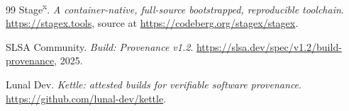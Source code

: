 \documentclass[11pt]{article}
\begin{document}
\begin{thebibliography}{99}
Stage\textsuperscript{x}.
\newblock \emph{A container-native, full-source bootstrapped, reproducible toolchain}.
\newblock \url{https://stagex.tools}, source at \url{https://codeberg.org/stagex/stagex}.

SLSA Community.
\newblock \emph{Build: Provenance v1.2}.
\newblock \url{https://slsa.dev/spec/v1.2/build-provenance}, 2025.

Lunal Dev.
\newblock \emph{Kettle: attested builds for verifiable software provenance}.
\newblock \url{https://github.com/lunal-dev/kettle}.

\end{thebibliography}
\end{document}
